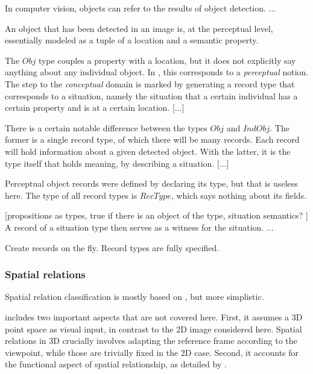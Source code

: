 In computer vision, objects can refer to the results of object detection.
...

An object that has been detected in an image is, at the perceptual level, essentially modeled as a tuple of a location and a semantic property.

The $Obj$ type couples a property with a location, but it does not explicitly say anything about any individual object.
In \cite{lspc}, this corresponds to a \textit{perceptual} notion.
The step to the \textit{conceptual} domain is marked by generating a record type that corresponds to a situation, namely the situation that a certain individual has a certain property and is at a certain location.
[...]

There is a certain notable difference between the types $Obj$ and $IndObj$.
The former is a single record type, of which there will be many records.
Each record will hold information about a given detected object.
With the latter, it is the type itself that holds meaning, by describing a situation.
[...]

Perceptual object records were defined by declaring its type, but that is useless here.
The type of all record types is $RecType$, which says nothing about its fields.

[propositions as types, true if there is an object of the type, situation semantics? \cite{BarwiseSituationsAttitudes1981}]
A record of a situation type then serves as a witness for the situation.
...

Create records on the fly.
Record types are fully specified.



\subsubsection{Spatial relations}

Spatial relation classification is mostly based on \cite{ttrspat}, but more simplistic.

\cite{ttrspat} includes two important aspects that are not covered here.
First, it assumes a 3D point space as visual input, in contrast to the 2D image considered here.
Spatial relations in 3D crucially involves adapting the reference frame according to the viewpoint, while those are trivially fixed in the 2D case.
Second, it accounts for the functional aspect of spatial relationship, as detailed by \cite{CoventryClassificationExtrageometricInfluences2004}.




